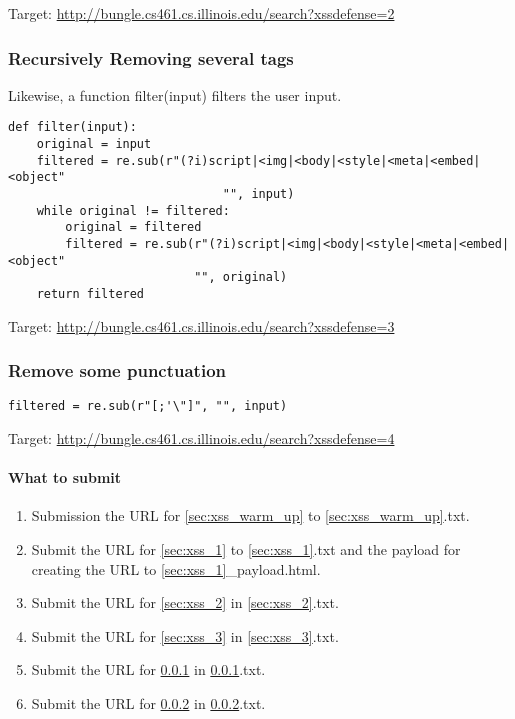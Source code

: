 \documentclass[letterpaper,12pt]{report}
\newcommand{\bungledomain}{http://bungle.cs461.cs.illinois.edu}
\begin{document}
Target: \url{\bungledomain/search?xssdefense=2}\\

\subsubsection{\textbf{Recursively Removing several tags}}
\label{sec:xss_4}
Likewise, a function filter(input) filters the user input.

\begin{mdframed}
\begin{Verbatim}
def filter(input):
    original = input
    filtered = re.sub(r"(?i)script|<img|<body|<style|<meta|<embed|<object"
                              "", input)
    while original != filtered:
        original = filtered
        filtered = re.sub(r"(?i)script|<img|<body|<style|<meta|<embed|<object"
                          "", original)
    return filtered
\end{Verbatim}
\end{mdframed}
\smallskip

Target: \url{\bungledomain/search?xssdefense=3}\\


\subsubsection{\textbf{Remove some punctuation}}
\label{sec:xss_5}
\verb+filtered = re.sub(r"[;'\"]", "", input)+
\smallskip

Target: \url{\bungledomain/search?xssdefense=4}\\

\paragraph{What to submit}
\begin{enumerate}
\item Submission the URL for \ref{sec:xss_warm_up} to {\ref{sec:xss_warm_up}.txt}. 
\item Submit the URL for {\ref{sec:xss_1}} to {\ref{sec:xss_1}.txt} and the payload for creating the URL to {\ref{sec:xss_1}\_payload.html}.
\item Submit the URL for \ref{sec:xss_2} in {\ref{sec:xss_2}.txt}.
\item Submit the URL for {\ref{sec:xss_3}} in {\ref{sec:xss_3}.txt}.
\item Submit the URL for {\ref{sec:xss_4}} in {\ref{sec:xss_4}.txt}.
\item Submit the URL for {\ref{sec:xss_5}} in {\ref{sec:xss_5}.txt}.
\end{enumerate}
\end{document}
